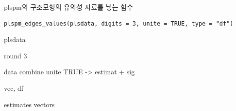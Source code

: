 \documentclass[a4paper]{book}
\begin{document}
%
\begin{Description}
plspm의 구조모형의 유의성 자료를 넣는 함수
\end{Description}
%
\begin{Usage}
\begin{verbatim}
plspm_edges_values(plsdata, digits = 3, unite = TRUE, type = "df")
\end{verbatim}
\end{Usage}
%
\begin{Arguments}
\begin{ldescription}
\item[\code{plsdata}] plsdata

\item[\code{digits}] round 3

\item[\code{unite}] data combine unite TRUE -> estimat + sig

\item[\code{type}] vec, df
\end{ldescription}
\end{Arguments}
%
\begin{Value}
estimates vectors
\end{Value}
%
\end{document}
